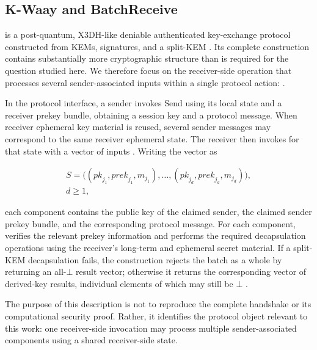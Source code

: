 \subsection{K-Waay and BatchReceive}

\kwaay is a post-quantum, X3DH-like deniable authenticated key-exchange
protocol constructed from KEMs, signatures, and a split-KEM
\cite{collins2024kwaay}. Its complete construction contains substantially
more cryptographic structure than is required for the question studied here.
We therefore focus on the receiver-side operation that processes several
sender-associated inputs within a single protocol action: \batchreceive.

In the protocol interface, a sender invokes \textsf{Send} using its local
state and a receiver prekey bundle, obtaining a session key and a protocol
message. When receiver ephemeral key material is reused, several sender
messages may correspond to the same receiver ephemeral state. The receiver
then invokes \batchreceive for that state with a vector of inputs
\cite[Sec.~4.1]{collins2024kwaayfull}. Writing the vector as

\begin{equation}
  \begin{gathered}
  S = \bigl((\mathit{pk}_{j_1},\mathit{prek}_{j_1},m_{j_1}),\ldots,
             (\mathit{pk}_{j_d},\mathit{prek}_{j_d},m_{j_d})\bigr),
  \\ d \geq 1,
  \end{gathered}
  \label{eq:kwaay-batch-input}
\end{equation}

each component contains the public key of the claimed sender, the claimed
sender prekey bundle, and the corresponding protocol message. For each
component, \batchreceive verifies the relevant prekey information and performs
the required decapsulation operations using the receiver's long-term and
ephemeral secret material. If a split-KEM decapsulation fails, the construction
rejects the batch as a whole by returning an all-$\bot$ result vector;
otherwise it returns the corresponding vector of derived-key results,
individual elements of which may still be $\bot$
\cite[Sec.~5.1, Fig.~10]{collins2024kwaayfull}.

The purpose of this description is not to reproduce the complete handshake or
its computational security proof. Rather, it identifies the protocol object
relevant to this work: one receiver-side invocation may process multiple
sender-associated components using a shared receiver-side state.


